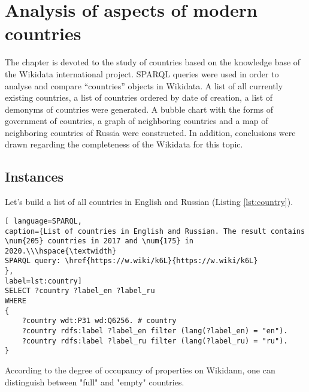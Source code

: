 \setchapterpreamble[u]{\margintoc}
\chapter{Analysis of aspects of modern countries\protect\footnotemark}


The chapter is devoted to the study of countries based on the knowledge base of the Wikidata international project. SPARQL queries were used in order to analyse and compare ``countries'' objects in Wikidata. A list of all currently existing countries, a list of countries ordered by date of creation, a list of demonyms of countries were generated. A bubble chart with the forms of government of countries, a graph of neighboring countries and a map of neighboring countries of Russia were constructed. In addition, conclusions were drawn regarding the completeness of the Wikidata for this topic.

\section{Instances}

Let's build a list of all countries in English and Russian (Listing \ref{lst:country}).

\begin{lstlisting}[ language=SPARQL, 
caption={List of countries in English and Russian. The result contains \num{205} countries in 2017 and \num{175} in 2020.\\\hspace{\textwidth}
SPARQL query: \href{https://w.wiki/k6L}{https://w.wiki/k6L}
},
label=lst:country]
SELECT ?country ?label_en ?label_ru
WHERE
{
	?country wdt:P31 wd:Q6256. # country
	?country rdfs:label ?label_en filter (lang(?label_en) = "en").
	?country rdfs:label ?label_ru filter (lang(?label_ru) = "ru").
}
\end{lstlisting}

According to the degree of occupancy of properties on Wikidann, one can distinguish between "full" and "empty" countries.

